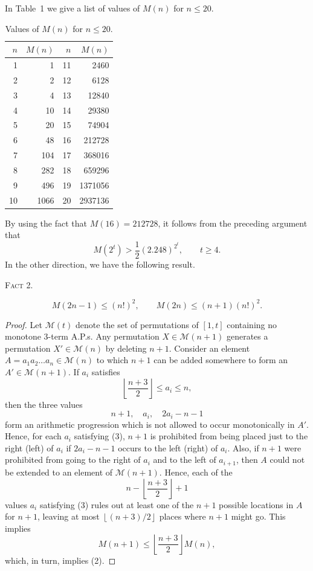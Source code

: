 \documentclass[10pt]{article}
\newcommand{\Mcal}{\mathscr{M}}
\newcommand{\fact}[1]{\par\medskip\noindent\textsc{Fact #1.}\par\smallskip}
\begin{document}
In Table~1 we give a list of values of $M(n)$ for $n\le20$.

\begin{table}[ht]
\centering
\caption{Values of $M(n)$ for $n\le20$.}
\begin{tabular}{@{}rr@{\qquad}rr@{}}
\toprule
$n$ & $M(n)$ & $n$ & $M(n)$ \\
\midrule
 1 &       1 & 11 &    2460 \\
 2 &       2 & 12 &    6128 \\
 3 &       4 & 13 &   12840 \\
 4 &      10 & 14 &   29380 \\
 5 &      20 & 15 &   74904 \\
 6 &      48 & 16 &  212728 \\
 7 &     104 & 17 &  368016 \\
 8 &     282 & 18 &  659296 \\
 9 &     496 & 19 & 1371056 \\
10 &    1066 & 20 & 2937136 \\
\bottomrule
\end{tabular}
\end{table}

By using the fact that $M(16)=212728$, it follows from the preceding
argument that
\[
 M(2^t)>\frac12(2.248)^{2^t},\qquad t\ge4.
\]
In the other direction, we have the following result.

\fact{2}
\begin{equation}
 M(2n-1)\le(n!)^2,
 \qquad
 M(2n)\le(n+1)(n!)^2.
 \tag{2}
\end{equation}

\begin{proof}
Let $\Mcal(t)$ denote the set of permutations of $[1,t]$ containing no
monotone 3-term A.P.s. Any permutation $X\in\Mcal(n+1)$ generates a
permutation $X'\in\Mcal(n)$ by deleting $n+1$. Consider an element
$A=a_1a_2\ldots a_n\in\Mcal(n)$ to which $n+1$ can be added somewhere to
form an $A'\in\Mcal(n+1)$. If $a_i$ satisfies
\begin{equation}
 \left\lfloor\frac{n+3}{2}\right\rfloor\le a_i\le n,
 \tag{3}
\end{equation}
then the three values
\[
 n+1,\quad a_i,\quad 2a_i-n-1
\]
form an arithmetic progression which is not allowed to occur
monotonically in $A'$. Hence, for each $a_i$ satisfying (3), $n+1$ is
prohibited from being placed just to the right (left) of $a_i$ if
$2a_i-n-1$ occurs to the left (right) of $a_i$. Also, if $n+1$ were
prohibited from going to the right of $a_i$ and to the left of $a_{i+1}$,
then $A$ could not be extended to an element of $\Mcal(n+1)$. Hence, each
of the
\[
 n-\left\lfloor\frac{n+3}{2}\right\rfloor+1
\]
values $a_i$ satisfying (3) rules out at least one of the $n+1$ possible
locations in $A$ for $n+1$, leaving at most
$\left\lfloor(n+3)/2\right\rfloor$ places where $n+1$ might go. This
implies
\[
 M(n+1)\le
 \left\lfloor\frac{n+3}{2}\right\rfloor M(n),
\]
which, in turn, implies (2).
\end{proof}
\end{document}
